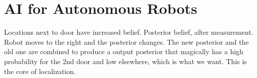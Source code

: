\chapter{AI for Autonomous Robots}
Locations next to door have increased belief. Posterior belief, after measurement.
Robot moves to the right and the posterior changes.
The new posterior and the old one are combined to produce a output posterior that magically has a high probability for the 2nd door and low elsewhere, which is what we want. This is the core of localization.






